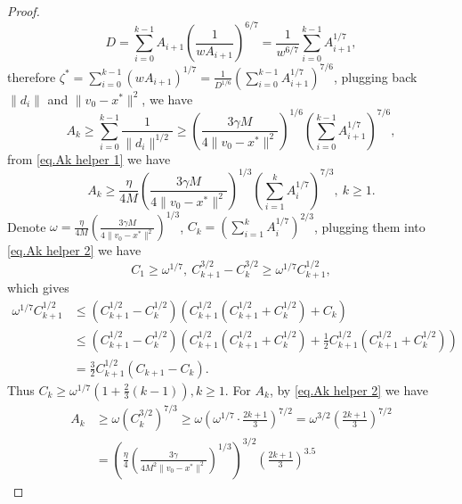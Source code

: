 \documentclass{article}
\begin{document}
\begin{proof}
\begin{equation*}
D=\sum_{i=0}^{k-1} A_{i+1}\left(\frac{1}{w A_{i+1}}\right)^{6 / 7}=\frac{1}{w^{6 / 7}} \sum_{i=0}^{k-1} A_{i+1}^{1 / 7},
\end{equation*}
therefore $\zeta^*=\sum_{i=0}^{k-1}\left(w A_{i+1}\right)^{1 / 7}=\frac{1}{D^{1 / 6}}\left(\sum_{i=0}^{k-1} A_{i+1}^{1 / 7}\right)^{7 / 6}$, plugging back $\|d_i\| $ and $ \|v_0-x^*\|^2$, we have
\begin{equation*}
    A_k\geq\sum_{i=0}^{k-1}\frac{1}{\|d_i\|^{1/2}} \geq \left (\frac{3\gamma M}{4\|v_0-x^*\|^2}\right)^{1/6} \left(\sum_{i=0}^{k-1} A_{i+1}^{1 / 7}\right)^{7 / 6},
\end{equation*}
from \eqref{eq.Ak helper 1} we have
\begin{equation}
    \label{eq.Ak helper 2}
    A_k \geq \frac{\eta}{4M}\left (\frac{3\gamma M}{4\|v_0-x^*\|^2}\right)^{1/3} \left(\sum_{i=1}^{k} A_{i}^{1 / 7}\right)^{7 / 3}, \ k\geq 1.
\end{equation}
Denote $\omega = \frac{\eta}{4M}\left (\frac{3\gamma M}{4\|v_0-x^*\|^2}\right)^{1/3}$, $C_k =\left(\sum_{i=1}^k A_i^{1 / 7}\right)^{2 / 3}$, plugging them into \eqref{eq.Ak helper 2} we have
\begin{equation*}
    C_1\geq\omega^{1/7},\ C_{k+1}^{3 / 2}-C_k^{3 / 2} \geq \omega^{1 / 7} C_{k+1}^{1 / 2},
\end{equation*}
which gives
\begin{equation*}
\begin{aligned}
\omega^{1 / 7} C_{k+1}^{1 / 2} & \leq\left(C_{k+1}^{1 / 2}-C_k^{1 / 2}\right)\left(C_{k+1}^{1 / 2}\left(C_{k+1}^{1 / 2}+C_k^{1 / 2}\right)+C_k\right) \\
& \leq\left(C_{k+1}^{1 / 2}-C_k^{1 / 2}\right)\left(C_{k+1}^{1 / 2}\left(C_{k+1}^{1 / 2}+C_k^{1 / 2}\right)+\frac{1}{2} C_{k+1}^{1 / 2}\left(C_{k+1}^{1 / 2}+C_k^{1 / 2}\right)\right) \\
& =\frac{3}{2} C_{k+1}^{1 / 2}\left(C_{k+1}-C_k\right).
\end{aligned}
\end{equation*}
Thus $C_k \geq \omega^{1 / 7}\left(1+\frac{2}{3}(k-1)\right), k \geq 1$. For $A_k$, by \eqref{eq.Ak helper 2} we have
\begin{equation*}
\begin{aligned}
A_k & \geq \omega\left(C_k^{3 / 2}\right)^{7 / 3} \geq \omega\left(\omega^{1 / 7} \cdot \frac{2 k+1}{3}\right)^{7 / 2}=\omega^{3 / 2}\left(\frac{2 k+1}{3}\right)^{7 / 2} \\
& =\left(\frac{\eta}{4}\left (\frac{3\gamma}{4M^2\|v_0-x^*\|^2}\right)^{1/3}\right)^{3 / 2}\left(\frac{2 k+1}{3}\right)^{3.5}
\end{aligned}
\end{equation*}
\end{proof}
\end{document}
